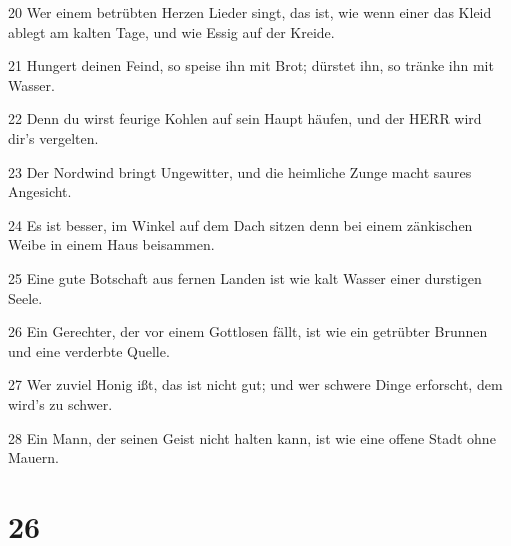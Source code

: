 \par 20 Wer einem betrübten Herzen Lieder singt, das ist, wie wenn einer das Kleid ablegt am kalten Tage, und wie Essig auf der Kreide.
\par 21 Hungert deinen Feind, so speise ihn mit Brot; dürstet ihn, so tränke ihn mit Wasser.
\par 22 Denn du wirst feurige Kohlen auf sein Haupt häufen, und der HERR wird dir's vergelten.
\par 23 Der Nordwind bringt Ungewitter, und die heimliche Zunge macht saures Angesicht.
\par 24 Es ist besser, im Winkel auf dem Dach sitzen denn bei einem zänkischen Weibe in einem Haus beisammen.
\par 25 Eine gute Botschaft aus fernen Landen ist wie kalt Wasser einer durstigen Seele.
\par 26 Ein Gerechter, der vor einem Gottlosen fällt, ist wie ein getrübter Brunnen und eine verderbte Quelle.
\par 27 Wer zuviel Honig ißt, das ist nicht gut; und wer schwere Dinge erforscht, dem wird's zu schwer.
\par 28 Ein Mann, der seinen Geist nicht halten kann, ist wie eine offene Stadt ohne Mauern.

\chapter{26}

